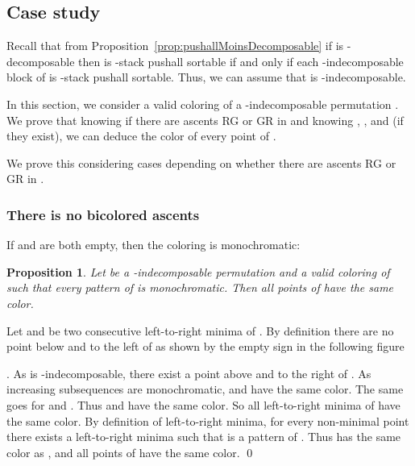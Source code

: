 \documentclass[11pt]{article}
\newenvironment{pf}{{\em \noindent Proof:}}{ \hfill \qed\smallskip}
\newtheorem{prop}[thm]{Proposition}
\begin{document}
\subsection{Case study}

Recall that from Proposition~\ref{prop:pushallMoinsDecomposable} if  is -decomposable then  is -stack pushall sortable 
if and only if each -indecomposable block of  is -stack pushall sortable.
Thus, we can assume that  is -indecomposable.

In this section, we consider a valid coloring  of a -indecomposable permutation .
We prove that knowing if there are ascents RG or GR in  and knowing , ,  and  (if they exist), we can deduce the color of every point of .

We prove this considering  cases depending on whether there are ascents RG or GR in .


\subsubsection{There is no bicolored ascents}

If  and  are both empty, then the coloring is monochromatic:
\begin{prop}\label{prop:monochromatic}
Let  be a -indecomposable permutation and  a valid coloring of  such that every pattern  of  is monochromatic. 
Then all points of  have the same color.
\end{prop}
\begin{pf}
Let  and  be two consecutive left-to-right minima of . 
By definition there are no point below  and to the left of  as shown by the empty sign in the following figure
.
As  is -indecomposable, there exist a point  above  and to the right of . 
As increasing subsequences are monochromatic,  and  have the same color. 
The same goes for  and . Thus  and  have the same color. 
So all left-to-right minima of  have the same color.
By definition of left-to-right minima, for every non-minimal point  there exists a left-to-right minima  such that  is a pattern  of . 
Thus  has the same color as , and all points of  have the same color.
\end{pf}
\end{document}
